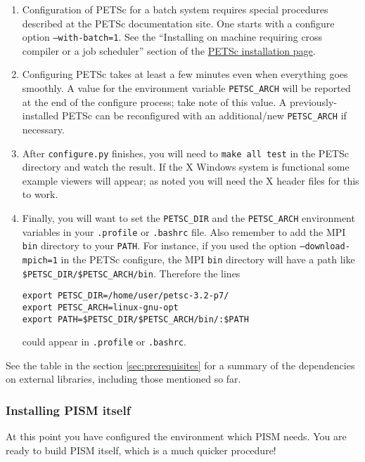 \documentclass[titlepage,letterpaper,final]{scrartcl}
\begin{document}
\begin{enumerate}
\item Configuration of PETSc for a batch system requires special procedures described at the PETSc documentation site.  One starts with a configure option \texttt{--with-batch=1}.  See the ``Installing on machine requiring cross compiler or a job scheduler'' section of the \href{http://www-unix.mcs.anl.gov/petsc/petsc-2/documentation/installation.html}{PETSc installation page}.

\item  Configuring PETSc takes at least a few minutes even when everything goes smoothly.   A value for the environment variable \texttt{PETSC_ARCH} will be reported at the end of the configure process; take note of this value.  A previously-installed PETSc can be reconfigured with an additional/new \texttt{PETSC_ARCH} if necessary.

\item  After \texttt{configure.py} finishes, you will need to \texttt{make all test} in the PETSc directory and watch the result.  If the X Windows system is functional some example viewers will appear; as noted you will need the X header files for this to work.

\item Finally, you will want to set the \texttt{PETSC_DIR} and the \texttt{PETSC_ARCH} environment variables in your \texttt{.profile} or \texttt{.bashrc} file.  Also remember to add the MPI \texttt{bin} directory to your \texttt{PATH}.  For instance, if you used the option \texttt{--download-mpich=1} in the PETSc configure, the MPI \texttt{bin} directory will have a path like \texttt{\$PETSC_DIR/\$PETSC_ARCH/bin}.  Therefore the lines 
\begin{verbatim}
export PETSC_DIR=/home/user/petsc-3.2-p7/
export PETSC_ARCH=linux-gnu-opt
export PATH=$PETSC_DIR/$PETSC_ARCH/bin/:$PATH
\end{verbatim}
\noindent could appear in \texttt{.profile} or \texttt{.bashrc}.
\end{enumerate}
\medskip See the table in the section \ref{sec:prerequisites} for a summary of the dependencies on external libraries, including
those mentioned so far.

\subsubsection{Installing PISM itself}
\label{sec:install-cmake}
At this point you have configured the environment which PISM needs.  You are ready to build PISM itself, which is a much quicker procedure!
\end{document}
